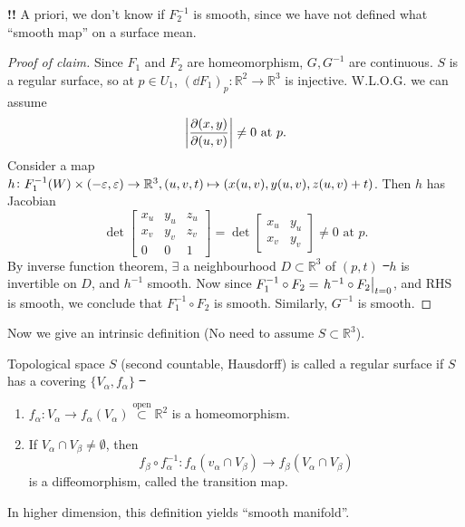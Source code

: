 \textbf{\color{red}!!} A priori, we don't know if \(F_2^{-1}\) is smooth, since we
have not defined what ``smooth map'' on a surface mean.

\begin{proof}[Proof of claim]
    Since \(F_1\) and \(F_2\) are homeomorphism, \(G,G^{-1}\) are continuous.
    \(S\) is a regular surface, so at \(p\in U_1\), \((\dd{F_1})_p\colon\mathbb{R}^2
    \to \mathbb{R}^3\) is injective. W.L.O.G. we can assume \[
        \left|\pdv{(x,y)}{(u,v)}\right|\neq 0\text{ at }p
    .\] Consider a map \(h\colon F_1^{-1}(W)\times (-\varepsilon,\varepsilon)\to \mathbb{R}^3,
    (u,v,t)\mapsto (x(u,v),y(u,v),z(u,v)+t)\). Then \(h\) has Jacobian \[
        \det \begin{bmatrix}
            x_u & y_u & z_u \\
            x_v & y_v & z_v \\
            0 & 0 & 1
        \end{bmatrix}
        =\det\begin{bmatrix}
            x_u & y_u \\
            x_v & y_v 
        \end{bmatrix}\neq 0 \text{ at }p
    .\] By inverse function theorem, \(\exists\) a neighbourhood \(D\subset
    \mathbb{R}^3\) of \((p,t)\) \st\ \(h\) is invertible on \(D\), and \(h^{-1}\)
    smooth. Now since \(F_1^{-1}\circ F_2=\eval{h^{-1}\circ F_2}_{t=0}\), and RHS
    is smooth, we conclude that \(F_1^{-1}\circ F_2\) is smooth. Similarly, \(G^{-1}\)
    is smooth.
\end{proof}

Now we give an intrinsic definition (No need to assume \(S\subset \mathbb{R}^3\)).
\begin{definition}
    Topological space \(S\) (second countable, Hausdorff) is called a regular surface
    if \(S\) has a covering \(\{V_\alpha,f_\alpha\}\) \st\ 
    \begin{enumerate}[(1)]
        \item \(f_\alpha\colon V_\alpha\to f_\alpha(V_\alpha)\overset{\text{open}}
            \subset \mathbb{R}^2\) is a homeomorphism.
        \item If \(V_\alpha\cap V_\beta\neq \emptyset\), then \[
            f_\beta\circ f_\alpha^{-1}\colon f_\alpha(v_\alpha\cap V_\beta)\to 
            f_\beta(V_\alpha\cap V_\beta)
        \] is a diffeomorphism, called the transition map.
    \end{enumerate}
\end{definition}
\begin{remark}
    In higher dimension, this definition yields ``smooth manifold''.
\end{remark}

